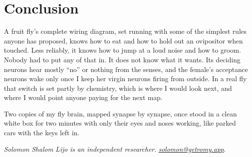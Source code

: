 \section{Conclusion}
\label{sec:conclusion}

A fruit fly's complete wiring diagram, set running with some of the simplest rules anyone has proposed, knows how to eat and how to hold out an ovipositor when touched. Less reliably, it knows how to jump at a loud noise and how to groom. Nobody had to put any of that in. It does not know what it wants. Its deciding neurons hear mostly ``no'' or nothing from the senses, and the female's acceptance neurons wake only once I keep her virgin neurons firing from outside. In a real fly that switch is set partly by chemistry, which is where I would look next, and where I would point anyone paying for the next map.

Two copies of my fly brain, mapped synapse by synapse, once stood in a clean white box for two minutes with only their eyes and noses working, like parked cars with the keys left in.

\bigskip
\noindent\emph{Solomon Shalom Lijo is an independent researcher.} \href{mailto:solomon@getromy.app}{\emph{solomon@getromy.app}}.

